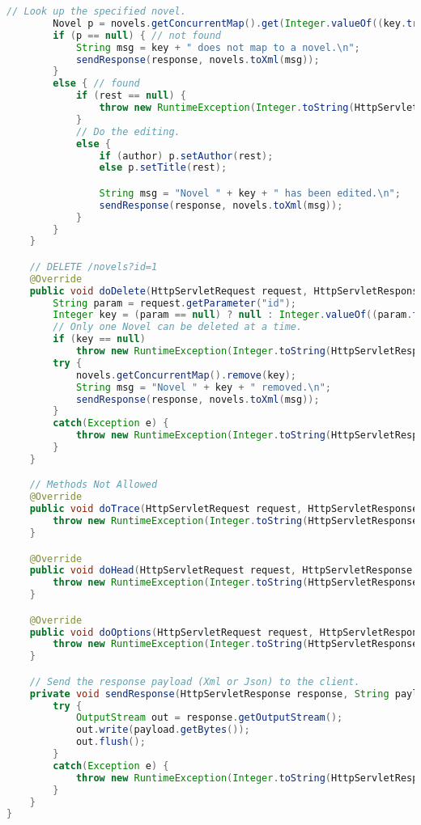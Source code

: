 \documentclass[12pt]{article}
\begin{document}
\begin{lstlisting}[language=java]
        // Look up the specified novel.
        Novel p = novels.getConcurrentMap().get(Integer.valueOf((key.trim())));
        if (p == null) { // not found
            String msg = key + " does not map to a novel.\n";
            sendResponse(response, novels.toXml(msg));
        }
        else { // found
            if (rest == null) {
                throw new RuntimeException(Integer.toString(HttpServletResponse.SC_BAD_REQUEST));
            }
            // Do the editing.
            else {
                if (author) p.setAuthor(rest);
                else p.setTitle(rest);

                String msg = "Novel " + key + " has been edited.\n";
                sendResponse(response, novels.toXml(msg));
            }
        }
    }

    // DELETE /novels?id=1
    @Override
    public void doDelete(HttpServletRequest request, HttpServletResponse response) {
        String param = request.getParameter("id");
        Integer key = (param == null) ? null : Integer.valueOf((param.trim()));
        // Only one Novel can be deleted at a time.
        if (key == null)
            throw new RuntimeException(Integer.toString(HttpServletResponse.SC_BAD_REQUEST));
        try {
            novels.getConcurrentMap().remove(key);
            String msg = "Novel " + key + " removed.\n";
            sendResponse(response, novels.toXml(msg));
        }
        catch(Exception e) {
            throw new RuntimeException(Integer.toString(HttpServletResponse.SC_INTERNAL_SERVER_ERROR));
        }
    }

    // Methods Not Allowed
    @Override
    public void doTrace(HttpServletRequest request, HttpServletResponse response) {
        throw new RuntimeException(Integer.toString(HttpServletResponse.SC_METHOD_NOT_ALLOWED));
    }

    @Override
    public void doHead(HttpServletRequest request, HttpServletResponse response) {
        throw new RuntimeException(Integer.toString(HttpServletResponse.SC_METHOD_NOT_ALLOWED));
    }

    @Override
    public void doOptions(HttpServletRequest request, HttpServletResponse response) {
        throw new RuntimeException(Integer.toString(HttpServletResponse.SC_METHOD_NOT_ALLOWED));
    }

    // Send the response payload (Xml or Json) to the client.
    private void sendResponse(HttpServletResponse response, String payload) {
        try {
            OutputStream out = response.getOutputStream();
            out.write(payload.getBytes());
            out.flush();
        }
        catch(Exception e) {
            throw new RuntimeException(Integer.toString(HttpServletResponse.SC_INTERNAL_SERVER_ERROR));
        }
    }
}

\end{lstlisting}
\end{document}
